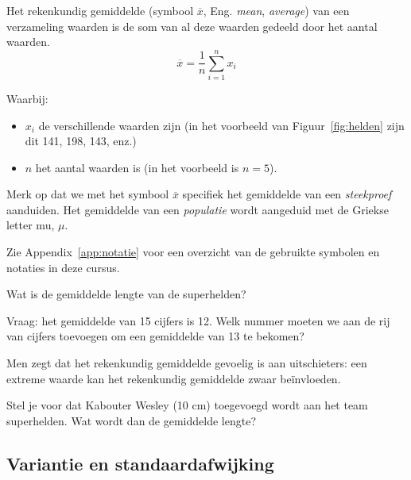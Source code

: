 \begin{definition}[Gemiddelde]
   Het rekenkundig gemiddelde (symbool $\overline{x}$, Eng. \emph{mean}, \emph{average}) van een verzameling waarden is de som van al deze waarden gedeeld door het aantal waarden.
  \begin{equation}
    \overline{x} = \frac{1}{n} \sum_{i=1}^{n} x_{i}
    \label{eq:Mean}
  \end{equation}

  Waarbij:
  \begin{itemize}
    \item $x_{i}$ de verschillende waarden zijn (in het voorbeeld van Figuur~\ref{fig:helden} zijn dit 141, 198, 143, enz.)
    \item $n$ het aantal waarden is (in het voorbeeld is $n = 5$).
  \end{itemize}
\end{definition}

\begin{remark}[!!]
  Merk op dat we met het symbool $\overline{x}$ specifiek het gemiddelde van een \emph{steekproef} aanduiden. Het gemiddelde van een \emph{populatie} wordt aangeduid met de Griekse letter mu, $\mu$.
  
  Zie Appendix~\ref{app:notatie} voor een overzicht van de gebruikte symbolen en notaties in deze cursus.
\end{remark}

\begin{exercise}
  Wat is de gemiddelde lengte van de superhelden?
\end{exercise}

\begin{exercise}
  Vraag: het gemiddelde van 15 cijfers is 12. Welk nummer moeten
  we aan de rij van cijfers toevoegen om een gemiddelde van 13 te bekomen?
\end{exercise}

\begin{exercise}
  Men zegt dat het rekenkundig gemiddelde gevoelig is aan uitschieters: een extreme waarde kan het rekenkundig gemiddelde zwaar beïnvloeden. 
  
  Stel je voor dat Kabouter Wesley (10 cm) toegevoegd wordt aan het team superhelden. Wat wordt dan de gemiddelde lengte?
\end{exercise}

\subsection{Variantie en standaardafwijking}
\label{sec:varEnSD}

